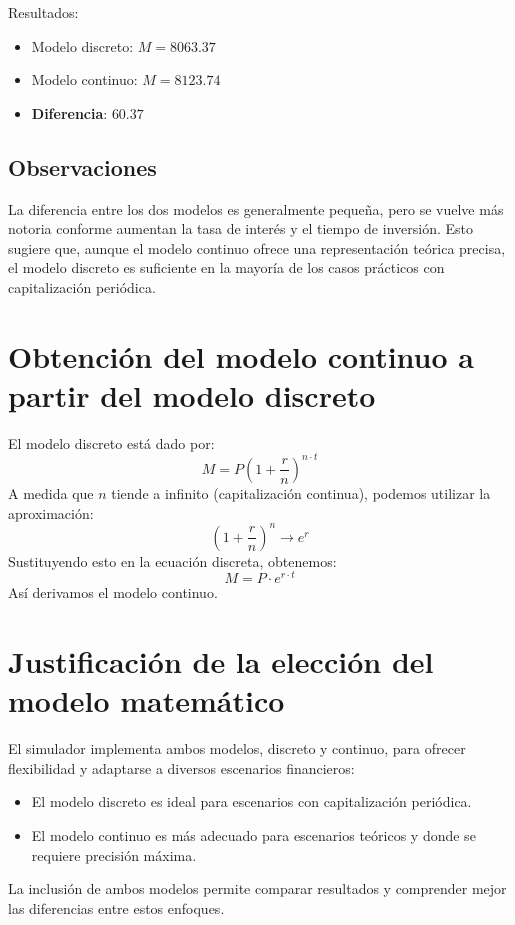 \documentclass{article}
\begin{document}
Resultados:
\begin{itemize}
    \item Modelo discreto: $M = 8063.37$
    \item Modelo continuo: $M = 8123.74$
    \item \textbf{Diferencia}: $60.37$
\end{itemize}

\subsection{Observaciones}
La diferencia entre los dos modelos es generalmente pequeña, pero se vuelve más notoria conforme aumentan la tasa de interés y el tiempo de inversión. Esto sugiere que, aunque el modelo continuo ofrece una representación teórica precisa, el modelo discreto es suficiente en la mayoría de los casos prácticos con capitalización periódica.

\section{Obtención del modelo continuo a partir del modelo discreto}
El modelo discreto está dado por:
\begin{equation}
M = P \left(1 + \frac{r}{n}\right)^{n \cdot t}
\end{equation}
A medida que $n$ tiende a infinito (capitalización continua), podemos utilizar la aproximación:
\begin{equation}
\left(1 + \frac{r}{n}\right)^n \to e^r
\end{equation}
Sustituyendo esto en la ecuación discreta, obtenemos:
\begin{equation}
M = P \cdot e^{r \cdot t}
\end{equation}
Así derivamos el modelo continuo.

\section{Justificación de la elección del modelo matemático}
El simulador implementa ambos modelos, discreto y continuo, para ofrecer flexibilidad y adaptarse a diversos escenarios financieros:
\begin{itemize}
    \item El modelo discreto es ideal para escenarios con capitalización periódica.
    \item El modelo continuo es más adecuado para escenarios teóricos y donde se requiere precisión máxima.
\end{itemize}
La inclusión de ambos modelos permite comparar resultados y comprender mejor las diferencias entre estos enfoques.
\end{document}
